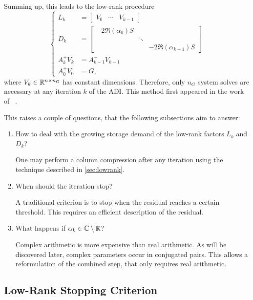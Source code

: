 Summing up,
this leads to the low-rank procedure
\begin{equation}
\label{eq:adi:si-lr-adi}
\left\{
\begin{aligned}
  L_k &= \begin{bmatrix}
    V_0 &
    \cdots &
    V_{k-1}
  \end{bmatrix} \\
  D_k &= \begin{bmatrix}
    -2 \Re(\alpha_0) S \\
    & \ddots \\
    && -2 \Re(\alpha_{k-1}) S
  \end{bmatrix} \\
  A_k^+ V_k &= A_{k-1}^- V_{k-1} \\
  A_0^+ V_0 &= G
  ,
\end{aligned}
\right.
\end{equation}
where $V_k \in\mathbb{R}^{n\times n_G}$ has constant dimensions.
Therefore, only $n_G$ system solves are necessary at any iteration $k$ of the \ac{ADI}.
This method first appeared in the work of \citeauthor{Benner2009}~\cite[Section~5]{Benner2009}.

\pagebreak
\noindent
This raises a couple of questions,
that the following subsections aim to answer:
\begin{enumerate}
  \item
    How to deal with the growing storage demand of the low-rank factors $L_k$ and $D_k$?

    One may perform a column compression after any iteration using the technique described in \autoref{sec:lowrank}.
  \item
    When should the iteration stop?

    A traditional criterion is to stop when the residual reaches a certain threshold.
    This requires an efficient description of the residual.
  \item
    What happens if $\alpha_k\in\mathbb{C}\setminus\mathbb{R}$?

    Complex arithmetic is more expensive than real arithmetic.
    As will be discovered later, complex parameters occur in conjugated pairs.
    This allows a reformulation of the combined step,
    that only requires real arithmetic.
\end{enumerate}

\subsection{Low-Rank Stopping Criterion}
\label{sec:adi:lrstop}

